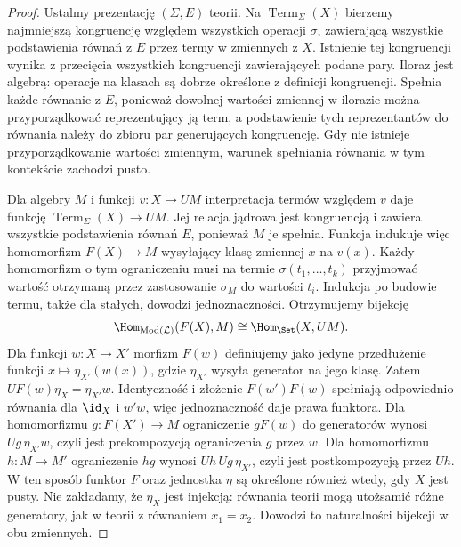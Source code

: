\begin{proof}
Ustalmy prezentację $(\Sigma,E)$ teorii. Na $\operatorname{Term}_\Sigma(X)$ bierzemy najmniejszą kongruencję względem wszystkich operacji $\sigma$, zawierającą wszystkie podstawienia równań z $E$ przez termy w zmiennych z $X$. Istnienie tej kongruencji wynika z przecięcia wszystkich kongruencji zawierających podane pary. Iloraz jest algebrą: operacje na klasach są dobrze określone z definicji kongruencji. Spełnia każde równanie z $E$, ponieważ dowolnej wartości zmiennej w ilorazie można przyporządkować reprezentujący ją term, a podstawienie tych reprezentantów do równania należy do zbioru par generujących kongruencję. Gdy nie istnieje przyporządkowanie wartości zmiennym, warunek spełniania równania w tym kontekście zachodzi pusto.

Dla algebry $M$ i funkcji $v:X\to UM$ interpretacja termów względem $v$ daje funkcję $\operatorname{Term}_\Sigma(X)\to UM$. Jej relacja jądrowa jest kongruencją i zawiera wszystkie podstawienia równań $E$, ponieważ $M$ je spełnia. Funkcja indukuje więc homomorfizm $F(X)\to M$ wysyłający klasę zmiennej $x$ na $v(x)$. Każdy homomorfizm o tym ograniczeniu musi na termie $\sigma(t_1,\ldots,t_k)$ przyjmować wartość otrzymaną przez zastosowanie $\sigma_M$ do wartości $t_i$. Indukcja po budowie termu, także dla stałych, dowodzi jednoznaczności. Otrzymujemy bijekcję
\[
 \Hom_{\operatorname{Mod}(\mathcal L)}(F(X),M)
 \cong\Hom_{\Set}(X,UM).
\]
Dla funkcji $w:X\to X'$ morfizm $F(w)$ definiujemy jako jedyne przedłużenie funkcji $x\mapsto\eta_{X'}(w(x))$, gdzie $\eta_{X'}$ wysyła generator na jego klasę. Zatem $UF(w)\eta_X=\eta_{X'}w$. Identyczność i złożenie $F(w')F(w)$ spełniają odpowiednio równania dla $\id_X$ i $w'w$, więc jednoznaczność daje prawa funktora. Dla homomorfizmu $g:F(X')\to M$ ograniczenie $gF(w)$ do generatorów wynosi $Ug\,\eta_{X'}w$, czyli jest prekompozycją ograniczenia $g$ przez $w$. Dla homomorfizmu $h:M\to M'$ ograniczenie $hg$ wynosi $Uh\,Ug\,\eta_{X'}$, czyli jest postkompozycją przez $Uh$. W ten sposób funktor $F$ oraz jednostka $\eta$ są określone również wtedy, gdy $X$ jest pusty. Nie zakładamy, że $\eta_X$ jest injekcją: równania teorii mogą utożsamić różne generatory, jak w teorii z równaniem $x_1=x_2$. Dowodzi to naturalności bijekcji w obu zmiennych.


\end{proof}
